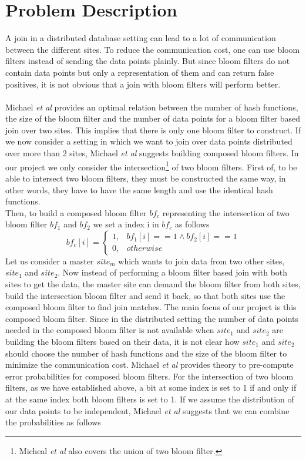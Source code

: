 \documentclass[12]{scrartcl}
\begin{document}
\section{Problem Description}
A join in a distributed database setting can lead to a lot of communication between the different sites. To reduce the communication cost, one can use bloom filters instead of sending the data points plainly. But since bloom filters do not contain data points but only a representation of them and can return false positives, it is not obvious that a join with bloom filters will perform better.\\\\
Michael {\em et al}\cite{michael} provides an optimal relation between the number of hash functions, the size of the bloom filter and the number of data points for a bloom filter based join over two sites. This implies that there is only one bloom filter to construct. If we now consider a setting in which we want to join over data points distributed over more than 2 sites, Michael {\em et al}\cite{michael} suggests building composed bloom filters. In our project we only consider the intersection\footnote{Micheal {\em et al}\cite{michael} also covers the union of two bloom filter.} of two bloom filters. First of, to be able to intersect two bloom filters, they must be constructed the same way, in other words, they have to have the same length and use the identical hash functions.\\ Then, to build a composed bloom filter $bf_c$ representing the intersection of two bloom filter  $bf_1$ and $bf_2$ we set a index i in $bf_c$ as follows
\begin{equation}
	bf_c[i] = 
	\begin{cases}
	1, & bf_1[i] == 1 \wedge bf_2[i] == 1\\
	0, & otherwise
	\end{cases}
\end{equation}
Let us consider a master $site_m$ which wants to join data from two other sites, $site_1$ and $site_2$. Now instead of performing a bloom filter based join with both sites to get the data, the master site can demand the bloom filter from both sites, build the intersection bloom filter and send it back, so that both sites use the composed bloom filter to find join matches. The main focus of our project is this composed bloom filter. Since in the distributed setting the number of data points needed in the composed bloom filter is not available when $site_1$ and $site_2$ are building the bloom filters based on their data, it is not clear how $site_1$ and $site_2$ should choose the number of hash functions and the size of the bloom filter to minimize the communication cost. Michael {\em et al}\cite{michael} provides theory to pre-compute error probabilities for composed bloom filters. For the intersection of two bloom filters, as we have established above, a bit at some index is set to 1 if and only if at the same index both bloom filters is set to 1. If we assume the distribution of our data points to be independent, Michael {\em et al}\cite{michael} suggests that we can combine the probabilities as follows
\end{document}
